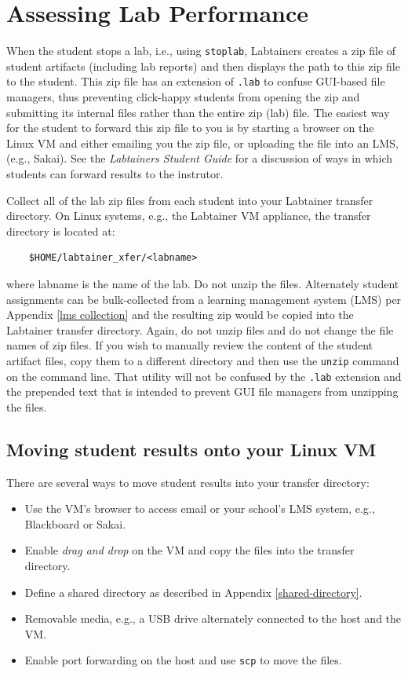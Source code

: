\documentclass[12pt]{article}
\begin{document}
\section{Assessing Lab Performance}
When the student stops a lab, i.e., using {\tt stoplab}, Labtainers creates a zip file of
student artifacts (including lab reports) and then displays the path to this zip file to
the student.  This zip file has an extension of {\tt .lab} to confuse GUI-based file managers,
thus preventing click-happy students from opening the zip and submitting its internal files rather than the entire
zip (lab) file.  The easiest way for the student to forward this zip file to you is by starting
a browser on the Linux VM and either emailing you the zip file, or uploading the file
into an LMS, (e.g., Sakai).  See the \textit{Labtainers Student Guide} for a discussion of
ways in which students can forward results to the instrutor.

Collect all of the lab zip files from each student into your Labtainer transfer directory.  On
Linux systems, e.g., the Labtainer VM appliance, the transfer directory is located at:

\begin{verbatim}
    $HOME/labtainer_xfer/<labname>
\end{verbatim}
\noindent where labname is the name of the lab.  Do not unzip the files.  Alternately student
assignments can be bulk-collected from a learning management system (LMS) per Appendix \ref{lms collection}
and the resulting zip  would be copied into the
Labtainer transfer directory.  Again, do not unzip files and do not change the file names of zip files.
If you wish to manually review the content of the student artifact files, copy them to a different directory and
then use the {\tt unzip} command on the command line.  That utility will not be confused by the {\tt .lab} extension
and the prepended text that is intended to prevent GUI file managers from unzipping the files.

\subsection{Moving student results onto your Linux VM}
There are several ways to move student results into your transfer directory:
\begin{itemize}
\item Use the VM's browser to access email or your school's LMS system, e.g., Blackboard or Sakai.
\item Enable \textit{drag and drop} on the VM and copy the files into the transfer directory.
\item Define a shared directory as described in Appendix \ref{shared-directory}.
\item Removable media, e.g., a USB drive alternately connected to the host and the VM.
\item Enable port forwarding on the host and use {\tt scp} to move the files.
\end{itemize}
\end{document}
